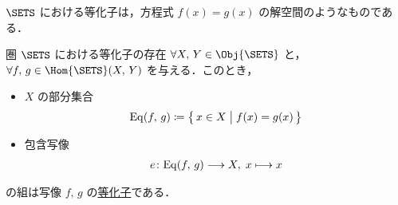\documentclass[geometry_main]{subfiles}
\begin{document}
$\SETS$ における等化子は，方程式 $f(x) = g(x)$ の解空間のようなものである．

\begin{myprop}[label=prop:equalizer-sets]{圏 $\SETS$ における等化子の存在}
	$\forall X,\, Y \in \Obj{\SETS}$ と，$\forall f,\, g \in \Hom{\SETS}(X,\, Y)$ を与える．このとき，
	\begin{itemize}
		\item $X$ の部分集合
		\begin{align}
			\label{eq:equalizer-sets}
			\mathrm{Eq}(f,\, g) \coloneqq \bigl\{\, x \in X \bigm| f(x) = g(x) \,\bigr\}
		\end{align}
		\item 包含写像
		\begin{align}
			e \colon \mathrm{Eq}(f,\, g) \longrightarrow X,\; x\longmapsto x
		\end{align}
	\end{itemize}
	の組は写像 $f,\, g$ の\hyperref[def:equalizer]{等化子}である．
\end{myprop}
\end{document}
